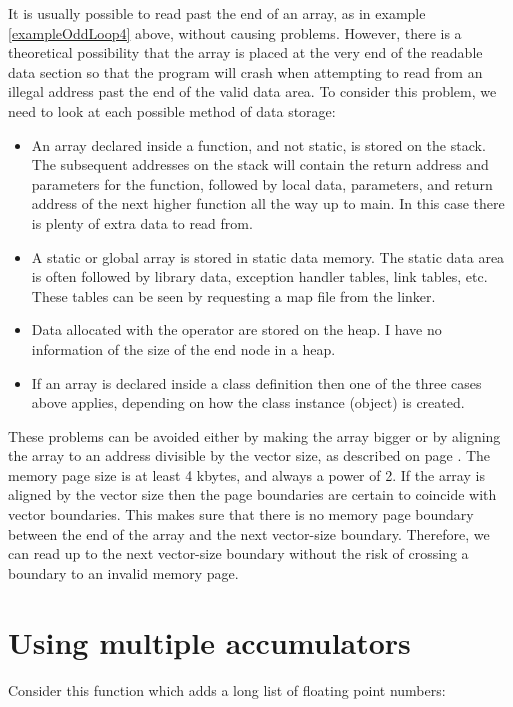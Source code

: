 \documentclass[vcl_manual.tex]{subfiles}
\begin{document}
It is usually possible to read past the end of an array, as in example \ref{exampleOddLoop4} above, without causing problems. However, there is a theoretical possibility that the array is placed at the very end of the readable data section so that the program will crash when attempting to read from an illegal address past the end of the valid data area. To consider this problem, we need to look at each possible method of data storage:
\begin{itemize}
  \item An array declared inside a function, and not static, is stored on the stack. The subsequent addresses on the stack will contain the return address and parameters for the function, followed by local data, parameters, and return address of the next higher function all the way up to main. In this case there is plenty of extra data to read from. 
  \item A static or global array is stored in static data memory. The static data area is often followed by library data, exception handler tables, link tables, etc. These tables can be seen by requesting a map file from the linker. 
  \item Data allocated with the operator  are stored on the heap. I have no information of the size of the end node in a heap.
  \item If an array is declared inside a class definition then one of the three cases above applies, depending on how the class instance (object) is created.
\end{itemize}

These problems can be avoided either by making the array bigger or by aligning the array to an address divisible by the vector size, as described on page \pageref{Alignment}. The memory page size is at least 4 kbytes, and always a power of 2. If the array is aligned by the vector size then the page boundaries are certain to coincide with vector boundaries. This makes sure that there is no memory page boundary between the end of the array and the next vector-size boundary. Therefore, we can read up to the next vector-size boundary without the risk of crossing a boundary to an invalid memory page.


\section{Using multiple accumulators} \label{UsingMultipleAccumulators}

Consider this function which adds a long list of floating point numbers:
\end{document}
